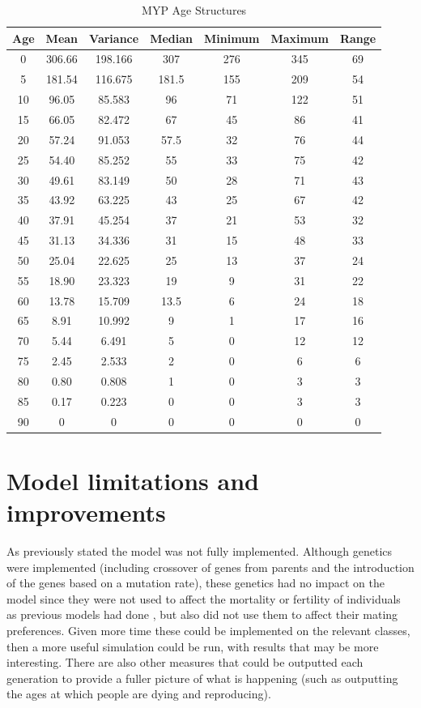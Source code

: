 \documentclass[authoryearcitations]{UoYCSproject}
\begin{document}
\begin{table}[h]
\caption{MYP Age Structures}
\label{tbl:mypAge}
\begin{tabular}{c c c c c c c}
\textbf{Age} & \textbf{Mean} & \textbf{Variance} & \textbf{Median} & \textbf{Minimum} & \textbf{Maximum} & \textbf{Range} \\\hline
0 & 306.66 & 198.166 & 307 & 276 & 345 & 69 \\\hline
5 & 181.54 & 116.675 & 181.5 & 155 & 209 & 54 \\\hline
10 & 96.05 & 85.583 & 96 & 71 & 122 & 51 \\\hline
15 & 66.05 & 82.472 & 67 & 45 & 86 & 41 \\\hline
20 & 57.24 & 91.053 & 57.5 & 32 & 76 & 44 \\\hline
25 & 54.40 & 85.252 & 55 & 33 & 75 & 42 \\\hline
30 & 49.61 & 83.149 & 50 & 28 & 71 & 43 \\\hline
35 & 43.92 & 63.225 & 43 & 25 & 67 & 42 \\\hline
40 & 37.91 & 45.254 & 37 & 21 & 53 & 32 \\\hline
45 & 31.13 & 34.336 & 31 & 15 & 48 & 33 \\\hline
50 & 25.04 & 22.625 & 25 & 13 & 37 & 24 \\\hline
55 & 18.90 & 23.323 & 19 & 9 & 31 & 22 \\\hline
60 & 13.78 & 15.709 & 13.5 & 6 & 24 & 18 \\\hline
65 & 8.91 & 10.992 & 9 & 1 & 17 & 16 \\\hline
70 & 5.44 & 6.491 & 5 & 0 & 12 & 12 \\\hline
75 & 2.45 & 2.533 & 2 & 0 & 6 & 6 \\\hline
80 & 0.80 & 0.808 & 1 & 0 & 3 & 3 \\\hline
85 & 0.17 & 0.223 & 0 & 0  & 3 & 3 \\\hline
90 & 0 & 0 & 0 & 0 & 0 & 0
\end{tabular}
\end{table}

\section{Model limitations and improvements}
As previously stated the model was not fully implemented. Although genetics were implemented (including crossover of genes from parents and the introduction of the genes based on a mutation rate), these genetics had no impact on the model since they were not used to affect the mortality or fertility of individuals as previous models had done \cite{mateChoice2013}, but also did not use them to affect their mating preferences. Given more time these could be implemented on the relevant classes, then a more useful simulation could be run, with results that may be more interesting. There are also other measures that could be outputted each generation to provide a fuller picture of what is happening (such as outputting the ages at which people are dying and reproducing).
\end{document}
